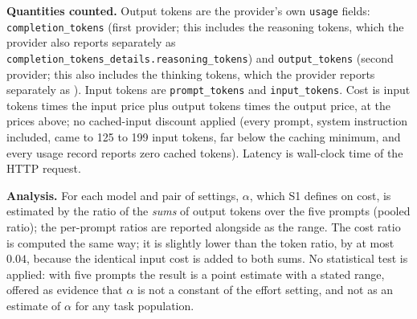 \documentclass[11pt]{article}
\begin{document}
\textbf{Quantities counted.} Output tokens are the provider's own \texttt{usage} fields:
\texttt{completion\_tokens} (first provider; this includes the reasoning tokens, which the
provider also reports separately as \texttt{completion\_tokens\_details.reasoning\_tokens})
and \texttt{output\_tokens} (second provider; this also includes the thinking tokens, which the provider reports separately as ). Input tokens are
\texttt{prompt\_tokens} and \texttt{input\_tokens}. Cost is input tokens times the input
price plus output tokens times the output price, at the prices above; no cached-input
discount applied (every prompt, system instruction included, came to 125 to 199 input tokens, far below the caching minimum, and every usage record reports zero cached tokens). Latency is wall-clock time of the HTTP request.

\textbf{Analysis.} For each model and pair of settings, $\alpha$, which S1 defines on cost, is estimated by the ratio of the
\emph{sums} of output tokens over the five prompts (pooled ratio); the per-prompt ratios
are reported alongside as the range. The cost ratio is computed the same way; it is slightly lower than the
token ratio, by at most $0.04$, because the identical input cost is added to both sums. No statistical test
is applied: with five prompts the result is a point estimate with a stated range, offered
as evidence that $\alpha$ is not a constant of the effort setting, and not as an estimate of $\alpha$ for any task population.
\end{document}
